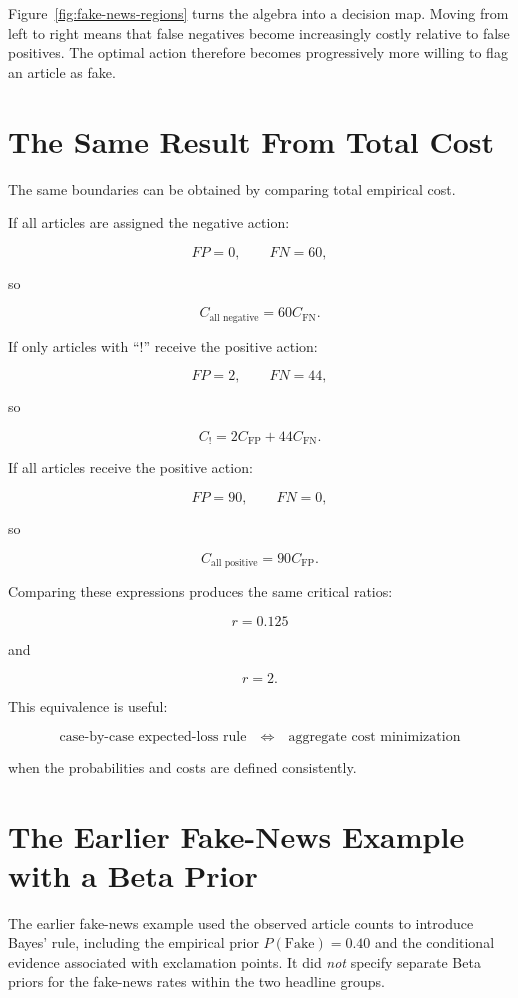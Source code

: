 \documentclass[11pt]{article}
\newcommand{\CFP}{C_{\mathrm{FP}}}
\newcommand{\CFN}{C_{\mathrm{FN}}}
\begin{document}
Figure~\ref{fig:fake-news-regions} turns the algebra into a decision map. Moving from left to right means that false negatives become increasingly costly relative to false positives. The optimal action therefore becomes progressively more willing to flag an article as fake.

\section{The Same Result From Total Cost}

The same boundaries can be obtained by comparing total empirical cost.

If all articles are assigned the negative action:

\[
FP=0,
\qquad
FN=60,
\]

so

\[
C_{\text{all negative}}
=
60\CFN.
\]

If only articles with ``!'' receive the positive action:

\[
FP=2,
\qquad
FN=44,
\]

so

\[
C_{!}
=
2\CFP+44\CFN.
\]

If all articles receive the positive action:

\[
FP=90,
\qquad
FN=0,
\]

so

\[
C_{\text{all positive}}
=
90\CFP.
\]

Comparing these expressions produces the same critical ratios:

\[
r=0.125
\]

and

\[
r=2.
\]

This equivalence is useful:

\[
\boxed{
\text{case-by-case expected-loss rule}
\quad\Longleftrightarrow\quad
\text{aggregate cost minimization}
}
\]

when the probabilities and costs are defined consistently.

\section{The Earlier Fake-News Example with a Beta Prior}

The earlier fake-news example used the observed article counts to introduce Bayes' rule, including the empirical prior $P(\text{Fake})=0.40$ and the conditional evidence associated with exclamation points. It did \emph{not} specify separate Beta priors for the fake-news rates within the two headline groups.
\end{document}
